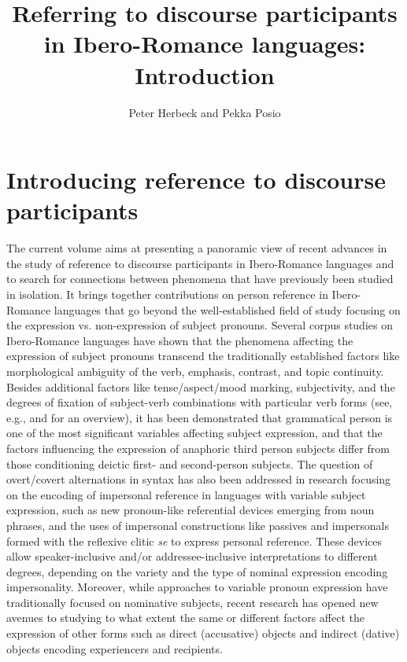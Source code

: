 \documentclass[output=paper]{langscibook}
\author{Peter Herbeck\affiliation{University of Vienna \& University of Wuppertal} and Pekka Posio\orcid{}\affiliation{University of Helsinki}}
\title[Introduction]
      {Referring to discourse participants in Ibero-Romance languages: Introduction}
\begin{document}
\maketitle

\section{Introducing reference to discourse participants} 

The current volume aims at presenting a panoramic view of recent advances in the study of reference to discourse participants in Ibero-Romance languages and to search for connections between phenomena that have previously been studied in isolation. It brings together contributions on person reference in Ibero-Romance languages that go beyond the well-established field of study focusing on the expression vs. non-expression of subject pronouns. Several corpus studies on Ibero-Romance languages have shown that the phenomena affecting the expression of subject pronouns transcend the traditionally established factors like morphological ambiguity of the verb, emphasis, contrast, and topic continuity. Besides additional factors like tense/aspect/mood marking, subjectivity, and the degrees of fixation of subject-verb combinations with particular verb forms (see, e.g., \citealt{CarvalhoShin2015} and \citealt{Posio2018} for an overview), it has been demonstrated that grammatical person is one of the most significant variables affecting subject expression, and that the factors influencing the expression of anaphoric third person subjects differ from those conditioning deictic first- and second-person subjects. The question of overt/covert alternations in syntax has also been addressed in research focusing on the encoding of impersonal reference in languages with variable subject expression, such as new pronoun-like referential devices emerging from noun phrases, and the uses of impersonal constructions like passives and impersonals formed with the reflexive clitic \textit{se}  to express personal reference. These devices allow speaker-inclusive and/or addressee-inclusive interpretations to different degrees, depending on the variety and the type of nominal expression encoding impersonality. Moreover, while approaches to variable pronoun expression have traditionally focused on nominative subjects, recent research has opened new avenues to studying to what extent the same or different factors affect the expression of other forms such as direct (accusative) objects and indirect (dative) objects encoding experiencers and recipients.
\end{document}
